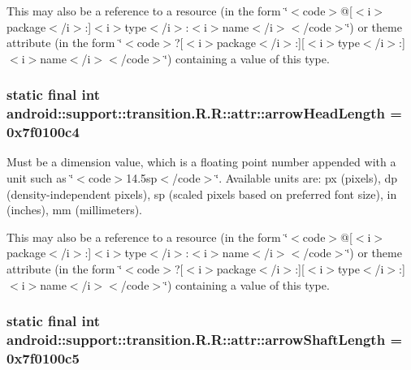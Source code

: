 This may also be a reference to a resource (in the form \char`\"{}$<$code$>$@\mbox{[}$<$i$>$package$<$/i$>$:\mbox{]}$<$i$>$type$<$/i$>$:$<$i$>$name$<$/i$>$$<$/code$>$\char`\"{}) or theme attribute (in the form \char`\"{}$<$code$>$?\mbox{[}$<$i$>$package$<$/i$>$:\mbox{]}\mbox{[}$<$i$>$type$<$/i$>$:\mbox{]}$<$i$>$name$<$/i$>$$<$/code$>$\char`\"{}) containing a value of this type. \hypertarget{classandroid_1_1support_1_1transition_1_1_r_1_1attr_2e4c7496fdc15b22fa0e73c26a9f111b}{
\subsubsection[{arrowHeadLength}]{\setlength{\rightskip}{0pt plus 5cm}static final int android::support::transition.R.R::attr::arrowHeadLength = 0x7f0100c4}}
\label{classandroid_1_1support_1_1transition_1_1_r_1_1attr_2e4c7496fdc15b22fa0e73c26a9f111b}


Must be a dimension value, which is a floating point number appended with a unit such as \char`\"{}$<$code$>$14.5sp$<$/code$>$\char`\"{}. Available units are: px (pixels), dp (density-independent pixels), sp (scaled pixels based on preferred font size), in (inches), mm (millimeters). 

This may also be a reference to a resource (in the form \char`\"{}$<$code$>$@\mbox{[}$<$i$>$package$<$/i$>$:\mbox{]}$<$i$>$type$<$/i$>$:$<$i$>$name$<$/i$>$$<$/code$>$\char`\"{}) or theme attribute (in the form \char`\"{}$<$code$>$?\mbox{[}$<$i$>$package$<$/i$>$:\mbox{]}\mbox{[}$<$i$>$type$<$/i$>$:\mbox{]}$<$i$>$name$<$/i$>$$<$/code$>$\char`\"{}) containing a value of this type. \hypertarget{classandroid_1_1support_1_1transition_1_1_r_1_1attr_ea7c6d144dd88c56e20fc3b8af8d02a4}{
\subsubsection[{arrowShaftLength}]{\setlength{\rightskip}{0pt plus 5cm}static final int android::support::transition.R.R::attr::arrowShaftLength = 0x7f0100c5}}
\label{classandroid_1_1support_1_1transition_1_1_r_1_1attr_ea7c6d144dd88c56e20fc3b8af8d02a4}


